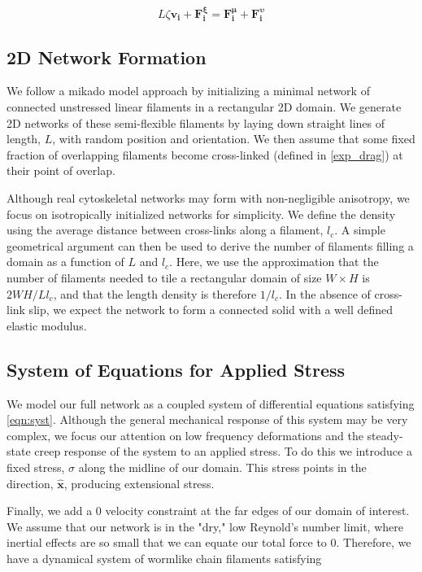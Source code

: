 \documentclass[10pt,letterpaper]{article}
\begin{document}
\begin{equation}
\label{eqn:syst}
L\zeta\mathbf{ v_i} +\mathbf{F^{\xi}_i}= \mathbf{F^{\mu}_i}+\mathbf{F^{\upsilon}_i}
\end{equation}

\subsection*{2D Network Formation}

We follow a mikado model approach by initializing a minimal network of connected unstressed linear filaments in a rectangular 2D domain.  We generate 2D networks of these semi-flexible filaments by laying down straight lines of length, $L$, with random position and orientation. We then assume that some fixed fraction of overlapping filaments become cross-linked (defined in \ref{exp_drag}) at their point of overlap.

Although real cytoskeletal networks may form with non-negligible anisotropy,  we  focus on isotropically initialized networks for simplicity.  We define the density using the average distance between cross-links along a filament, $l_c$. A simple geometrical argument can then be used to derive the number of filaments filling a domain as a function of $L$ and $l_c$\cite{theo_hlm}.  Here, we use the approximation that the number of filaments needed to tile a rectangular domain of size $W \times H$  is $2WH/Ll_c$, and that the length density is therefore $1/l_c$. In the absence of cross-link slip, we expect the network to form a connected solid with a well defined elastic modulus\cite{theo_hlm,theo_hlm2}.  


\subsection*{System of Equations for Applied Stress}
We model our full network as a coupled system of differential equations satisfying \ref{eqn:syst}.  Although the general mechanical response of this system may be very complex, we focus our attention on low frequency deformations and the steady-state creep response of the system to an applied stress.  To do this we introduce a fixed stress, $\sigma$ along the midline of our domain.  This stress points in the direction, $\mathbf{\hat{x}}$, producing extensional stress.

Finally, we add a 0 velocity constraint at the far edges of our domain of interest.  We assume that our network is in the "dry," low Reynold's number limit, where inertial effects are so small that we can equate our total force to 0.  Therefore, we have a dynamical system of wormlike chain filaments satisfying
\end{document}
